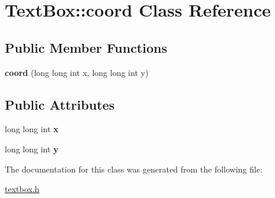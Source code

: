\hypertarget{a00016}{}\section{Text\+Box\+:\+:coord Class Reference}
\label{a00016}
\subsection*{Public Member Functions}
\begin{DoxyCompactItemize}
\item 
\mbox{\label{a00016_a45f1b7e91f95b4a3eecf911b7a1d9a72}} 
{\bfseries coord} (long long int x, long long int y)
\end{DoxyCompactItemize}
\subsection*{Public Attributes}
\begin{DoxyCompactItemize}
\item 
\mbox{\label{a00016_afbe957866d778f4be672a5a0c91058e9}} 
long long int {\bfseries x}
\item 
\mbox{\label{a00016_a72c8755a6bb77c078293dc1b2101f333}} 
long long int {\bfseries y}
\end{DoxyCompactItemize}


The documentation for this class was generated from the following file\+:\begin{DoxyCompactItemize}
\item 
\hyperlink{a00005}{textbox.\+h}\end{DoxyCompactItemize}
